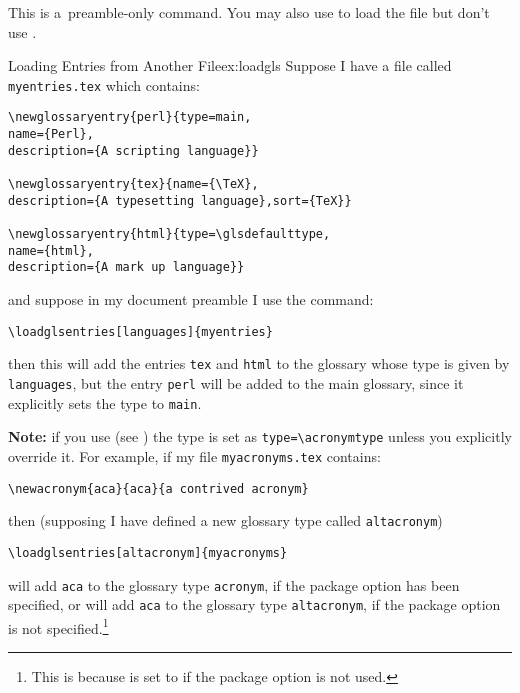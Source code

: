 \documentclass[report,inlinetitle]{nlctdoc}
\begin{document}
This is a~preamble-only command. You may also use  to load
the file but don't use .

\begin{example}{Loading Entries from Another File}{ex:loadgls}
Suppose I have a file called \texttt{myentries.tex} which contains:
\begin{verbatim}
\newglossaryentry{perl}{type=main,
name={Perl},
description={A scripting language}}

\newglossaryentry{tex}{name={\TeX},
description={A typesetting language},sort={TeX}}

\newglossaryentry{html}{type=\glsdefaulttype,
name={html},
description={A mark up language}}
\end{verbatim}
and suppose in my document preamble I use the command:
\begin{verbatim}
\loadglsentries[languages]{myentries}
\end{verbatim}
then this will add the entries \texttt{tex} and \texttt{html}
to the glossary whose type is given by \texttt{languages}, but
the entry \texttt{perl} will be added to the main glossary, since
it explicitly sets the type to \texttt{main}.
\end{example}

\textbf{Note:} if you use  (see
) the type is set as
\verb|type=\acronymtype| unless you explicitly override it. For
example, if my file \texttt{myacronyms.tex} contains:
\begin{verbatim}
\newacronym{aca}{aca}{a contrived acronym}
\end{verbatim}
then (supposing I have defined a new glossary type called
\texttt{altacronym})
\begin{verbatim}
\loadglsentries[altacronym]{myacronyms}
\end{verbatim}
will add \texttt{aca} to the glossary type \texttt{acronym}, if the
package option  has been specified, or will add
\texttt{aca} to the glossary type \texttt{altacronym}, if the
package option  is not specified.\footnote{This is
because  is set to  if the
 package option is not used.}
\end{document}
